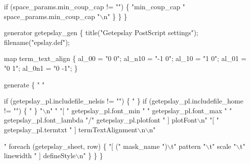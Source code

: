         if (space_params.min_coup_cap != "") \{
            "min_coup_cap      " space_params.min_coup_cap "\(\backslash\)n"
        \}
    \}
\}

generator getepslay_gen \{
    title("Getepslay PostScript settings");
    filename("epslay.def");

    map term_text_align \{
        al_00   = "0 0";
        al_n10  = "-1 0";
        al_10   = "1 0";
        al_01   = "0 1";
        al_0n1  = "0 -1";
    \}

    generate \{
        "%
        "%

        if (getepslay_pl.includefile_nelsis != "") \{
            "%
        \}
        if (getepslay_pl.includefile_home != "") \{
            "%
        \}
        "\(\backslash\)n"
        "%
        "[ " getepslay_pl.font_min " " getepslay_pl.font_max " " getepslay_pl.font_lambda
        "/" getepslay_pl.plotfont " ] plotFont\(\backslash\)n"
        "[ " getepslay_pl.termtxt " ] termTextAlignment\(\backslash\)n\(\backslash\)n"


        "%
        foreach (getepslay_sheet, row) \{
            "[ (" mask_name ")\(\backslash\)t" pattern "\(\backslash\)t" scale "\(\backslash\)t" linewidth " ] defineStyle\(\backslash\)n"
        \}
    \}
\}
